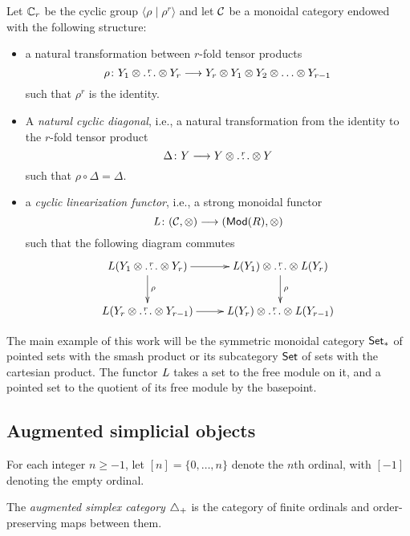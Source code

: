 Let $\mathbb{C}_r$ be the cyclic group $\langle\rho\mid \rho^r\rangle$ and let $\mathcal{C}$ be a monoidal category %
endowed with the following structure:
\begin{itemize}
    \item a natural transformation between $r$-fold tensor products
	\[
	\rho \colon  Y_1 \otimes   \overset{r}{\ldots} \otimes  Y_r\longrightarrow Y_r \otimes  Y_1 \otimes  Y_2 \otimes  \ldots  \otimes  Y_{r-1}
	\]
	such that $\rho^r$ is the identity.
	\item A \emph{natural cyclic diagonal}, i.e., a natural transformation from the identity to the $r$-fold tensor product
	\[
	\Delta \colon  Y\longrightarrow Y \otimes  \overset{r}{\ldots} \otimes  Y
	\]
	such that $\rho\circ \Delta = \Delta$.
	\item a \emph{cyclic linearization functor}, i.e., a %
    strong monoidal functor
	\[
    \operatorname{{\it L}} \colon  (\mathcal{C}, \otimes )\longrightarrow (\mathsf{Mod}(R), \otimes )
	\]
	such that the following diagram commutes
	\[
	\xymatrix{
		L(Y_1 \ot  \overset{r}{\ldots}  \ot  Y_r)  \ar[r]\ar[d]^{\rho} & \abel(Y_1) \ot  \overset{r}{\ldots}  \ot  \abel(Y_r)\ar[d]^{\rho} \\
		L(Y_{r} \ot  \overset{r}{\ldots}  \ot  Y_{r-1})  \ar[r] & \abel(Y_r) \ot  \overset{r}{\ldots}  \ot  \abel(Y_{r-1}) }
	\]
\end{itemize}
The main example of this work will be the symmetric monoidal category $\mathsf{Set}_*$ of pointed sets with the smash product or its subcategory $\mathsf{Set}$ of sets with the cartesian product. The functor $\operatorname{{\it L}}$ takes a set to the free module on it, and a pointed set to the quotient of its free module by the basepoint.

\subsection{Augmented simplicial objects}\label{s:simplices}

For each integer $n\geq -1$, let $[n] = \{0,\ldots,n\}$ denote the $n$th ordinal, with $[-1]$ denoting the empty ordinal.

\begin{definition}
	The \emph{augmented simplex category} $\triangle_{+}$ is the category of finite ordinals and order-preserving maps between them. %
\end{definition}

